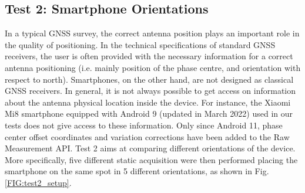 \subsection{Test 2:  Smartphone Orientations}
In a typical GNSS survey, the correct antenna position plays an important role in the quality of positioning. 
In the technical specifications of standard GNSS receivers, the user is often provided with the necessary information 
for a correct antenna positioning (i.e. mainly position of the phase centre, and orientation with respect to north). 
Smartphones, on the other hand, are not designed as classical GNSS receivers. In general, it is not always possible to get 
access on information about the antenna physical location inside the device.
For instance, the Xiaomi Mi8 smartphone equipped with Android 9 (updated in March 2022) used in our tests does
not give access to these information. Only since Android 11,  phase center offset coordinates and  
variation corrections have been added to the Raw Measurement API.
Test 2 aims at comparing different orientations of the device.
More specifically, five different static acquisition were then performed placing the smartphone on the same spot in  5 different orientations, as shown in Fig. \ref{FIG:test2_setup}.
